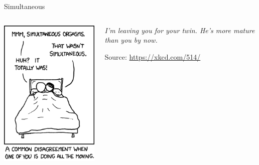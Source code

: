 
\begin{frame}[t,plain]
\titlepage
\end{frame}


\begin{frame}{Simultaneous}
%
\begin{columns}[T]
\vspace{-12pt}
\begin{center}
	\includegraphics[width=.6\linewidth]{./gfx/04-xkcd-simultaneous}
\end{center}
%
\vspace{+40pt}
\begin{center}
	\emph{I'm leaving you for your twin. He's more mature than you by now.}
	
	\vspace{12pt}
	Source: \url{https://xkcd.com/514/}
\end{center}
\end{columns}
%
\end{frame}


